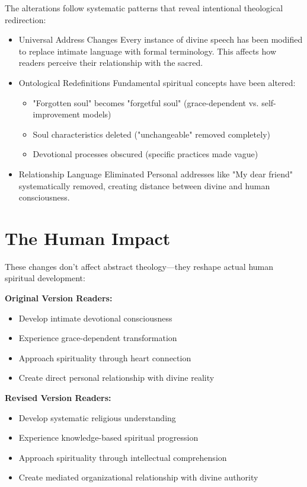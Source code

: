 \documentclass[11pt,twoside]{book}
\begin{document}
The alterations follow systematic patterns that reveal intentional theological redirection:
\begin{itemize}
\item Universal Address Changes
\label{sec:org9d19c8d}
Every instance of divine speech has been modified to replace intimate language with formal terminology. This affects how readers perceive their relationship with the sacred.
\item Ontological Redefinitions
\label{sec:orgec1eb86}
Fundamental spiritual concepts have been altered:
\begin{itemize}
\item "Forgotten soul" becomes "forgetful soul" (grace-dependent vs. self-improvement models)
\item Soul characteristics deleted ("unchangeable" removed completely)
\item Devotional processes obscured (specific practices made vague)
\end{itemize}
\item Relationship Language Eliminated
\label{sec:orgfcb285d}
Personal addresses like "My dear friend" systematically removed, creating distance between divine and human consciousness.

\sectionbreak
\end{itemize}
\section*{The Human Impact}
\label{sec:org78885da}

These changes don't affect abstract theology—they reshape actual human spiritual development:

\textbf{\textbf{Original Version Readers:}}
\begin{itemize}
\item Develop intimate devotional consciousness
\item Experience grace-dependent transformation
\item Approach spirituality through heart connection
\item Create direct personal relationship with divine reality
\end{itemize}

\textbf{\textbf{Revised Version Readers:}}
\begin{itemize}
\item Develop systematic religious understanding
\item Experience knowledge-based spiritual progression
\item Approach spirituality through intellectual comprehension
\item Create mediated organizational relationship with divine authority
\end{itemize}
\end{document}
